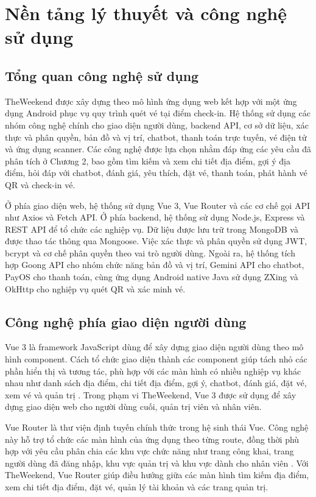 \documentclass[../DoAn.tex]{subfiles}
\begin{document}
\chapter{Nền tảng lý thuyết và công nghệ sử dụng}

\section{Tổng quan công nghệ sử dụng}

TheWeekend được xây dựng theo mô hình ứng dụng web kết hợp với một ứng dụng Android phục vụ quy trình quét vé tại điểm check-in. Hệ thống sử dụng các nhóm công nghệ chính cho giao diện người dùng, backend API, cơ sở dữ liệu, xác thực và phân quyền, bản đồ và vị trí, chatbot, thanh toán trực tuyến, vé điện tử và ứng dụng scanner. Các công nghệ được lựa chọn nhằm đáp ứng các yêu cầu đã phân tích ở Chương 2, bao gồm tìm kiếm và xem chi tiết địa điểm, gợi ý địa điểm, hỏi đáp với chatbot, đánh giá, yêu thích, đặt vé, thanh toán, phát hành vé QR và check-in vé.

Ở phía giao diện web, hệ thống sử dụng Vue 3, Vue Router và các cơ chế gọi API như Axios và Fetch API. Ở phía backend, hệ thống sử dụng Node.js, Express và REST API để tổ chức các nghiệp vụ. Dữ liệu được lưu trữ trong MongoDB và được thao tác thông qua Mongoose. Việc xác thực và phân quyền sử dụng JWT, bcrypt và cơ chế phân quyền theo vai trò người dùng. Ngoài ra, hệ thống tích hợp Goong API cho nhóm chức năng bản đồ và vị trí, Gemini API cho chatbot, PayOS cho thanh toán, cùng ứng dụng Android native Java sử dụng ZXing và OkHttp cho nghiệp vụ quét QR và xác minh vé.

\section{Công nghệ phía giao diện người dùng}

Vue 3 là framework JavaScript dùng để xây dựng giao diện người dùng theo mô hình component. Cách tổ chức giao diện thành các component giúp tách nhỏ các phần hiển thị và tương tác, phù hợp với các màn hình có nhiều nghiệp vụ khác nhau như danh sách địa điểm, chi tiết địa điểm, gợi ý, chatbot, đánh giá, đặt vé, xem vé và quản trị \cite{vue_docs}. Trong phạm vi TheWeekend, Vue 3 được sử dụng để xây dựng giao diện web cho người dùng cuối, quản trị viên và nhân viên.

Vue Router là thư viện định tuyến chính thức trong hệ sinh thái Vue. Công nghệ này hỗ trợ tổ chức các màn hình của ứng dụng theo từng route, đồng thời phù hợp với yêu cầu phân chia các khu vực chức năng như trang công khai, trang người dùng đã đăng nhập, khu vực quản trị và khu vực dành cho nhân viên \cite{vue_router_docs}. Với TheWeekend, Vue Router giúp điều hướng giữa các màn hình tìm kiếm địa điểm, xem chi tiết địa điểm, đặt vé, quản lý tài khoản và các trang quản trị.
\end{document}
